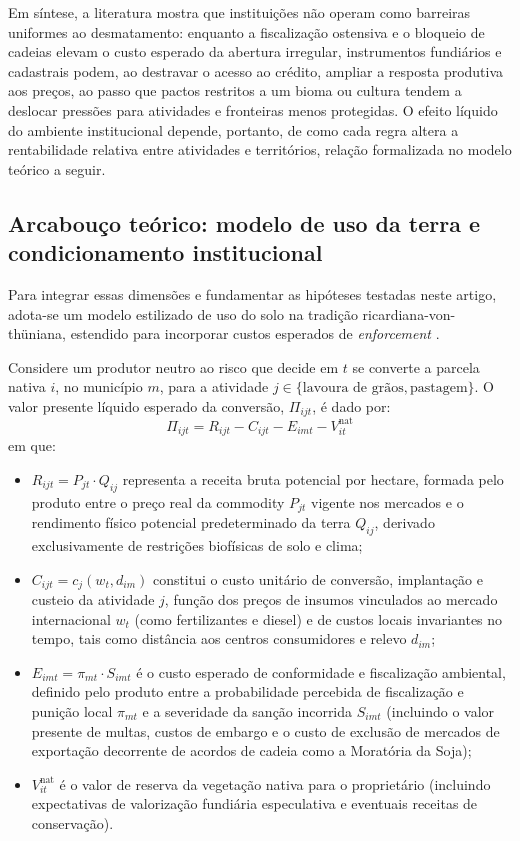 Em síntese, a literatura mostra que instituições não operam como barreiras uniformes ao desmatamento: enquanto a fiscalização ostensiva e o bloqueio de cadeias elevam o custo esperado da abertura irregular, instrumentos fundiários e cadastrais podem, ao destravar o acesso ao crédito, ampliar a resposta produtiva aos preços, ao passo que pactos restritos a um bioma ou cultura tendem a deslocar pressões para atividades e fronteiras menos protegidas. O efeito líquido do ambiente institucional depende, portanto, de como cada regra altera a rentabilidade relativa entre atividades e territórios, relação formalizada no modelo teórico a seguir.

\subsection{Arcabouço teórico: modelo de uso da terra e condicionamento institucional}
\label{literatura-arcabouco}

Para integrar essas dimensões e fundamentar as hipóteses testadas neste artigo, adota-se um modelo estilizado de uso do solo na tradição ricardiana-von-thüniana, estendido para incorporar custos esperados de \textit{enforcement} \cite{Angelsen2010, LubowskiEtAl2008, Shimshack2014}. 

Considere um produtor neutro ao risco que decide em $t$ se converte a parcela nativa $i$, no município $m$, para a atividade $j \in \{\text{lavoura de grãos}, \text{pastagem}\}$. O valor presente líquido esperado da conversão, $\Pi_{ijt}$, é dado por:
\begin{equation}
    \Pi_{ijt} = R_{ijt} - C_{ijt} - E_{imt} - V_{it}^{\mathrm{nat}}
    \label{eq:teorico-lucro}
\end{equation}
em que:
\begin{itemize}[itemsep=2pt,topsep=2pt]
    \item $R_{ijt} = P_{jt} \cdot Q_{ij}$ representa a receita bruta potencial por hectare, formada pelo produto entre o preço real da commodity $P_{jt}$ vigente nos mercados e o rendimento físico potencial predeterminado da terra $Q_{ij}$, derivado exclusivamente de restrições biofísicas de solo e clima;
    \item $C_{ijt} = c_j(w_t, d_{im})$ constitui o custo unitário de conversão, implantação e custeio da atividade $j$, função dos preços de insumos vinculados ao mercado internacional $w_t$ (como fertilizantes e diesel) e de custos locais invariantes no tempo, tais como distância aos centros consumidores e relevo $d_{im}$;
    \item $E_{imt} = \pi_{mt} \cdot S_{imt}$ é o custo esperado de conformidade e fiscalização ambiental, definido pelo produto entre a probabilidade percebida de fiscalização e punição local $\pi_{mt}$ e a severidade da sanção incorrida $S_{imt}$ (incluindo o valor presente de multas, custos de embargo e o custo de exclusão de mercados de exportação decorrente de acordos de cadeia como a Moratória da Soja);
    \item $V_{it}^{\mathrm{nat}}$ é o valor de reserva da vegetação nativa para o proprietário (incluindo expectativas de valorização fundiária especulativa e eventuais receitas de conservação).
\end{itemize}

